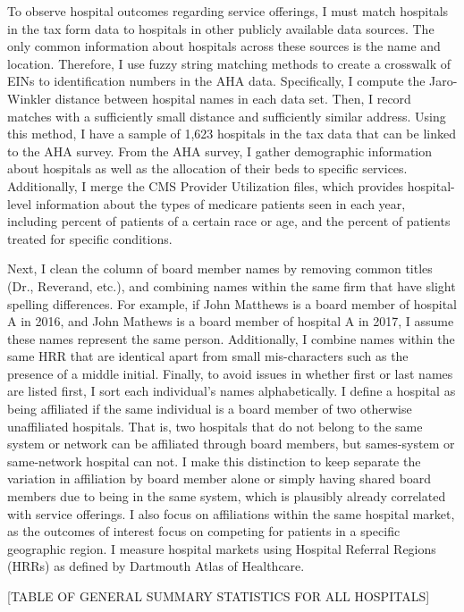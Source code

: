 \documentclass[12pt]{article}
\begin{document}
   To observe hospital outcomes regarding service offerings, I must match hospitals in the tax form data to hospitals in other publicly available data sources. The only common information about hospitals across these sources is the name and location. Therefore, I use fuzzy string matching methods to create a crosswalk of EINs to identification numbers in the AHA data. Specifically, I compute the Jaro-Winkler distance between hospital names in each data set. Then, I record matches with a sufficiently small distance and sufficiently similar address. Using this method, I have a sample of 1,623 hospitals in the tax data that can be linked to the AHA survey. From the AHA survey, I gather demographic information about hospitals as well as the allocation of their beds to specific services. Additionally, I merge the CMS Provider Utilization files, which provides hospital-level information about the types of medicare patients seen in each year, including percent of patients of a certain race or age, and the percent of patients treated for specific conditions.

    Next, I clean the column of board member names by removing common titles (Dr., Reverand, etc.), and combining names within the same firm that have slight spelling differences. For example, if John Matthews is a board member of hospital A in 2016, and John Mathews is a board member of hospital A in 2017, I assume these names represent the same person. Additionally, I combine names within the same HRR that are identical apart from small mis-characters such as the presence of a middle initial. Finally, to avoid issues in whether first or last names are listed first, I sort each individual's names alphabetically. I define a hospital as being affiliated if the same individual is a board member of two otherwise unaffiliated hospitals. That is, two hospitals that do not belong to the same system or network can be affiliated through board members, but sames-system or same-network hospital can not. I make this distinction to keep separate the variation in affiliation by board member alone or simply having shared board members due to being in the same system, which is plausibly already correlated with service offerings. I also focus on affiliations within the same hospital market, as the outcomes of interest focus on competing for patients in a specific geographic region. I measure hospital markets using Hospital Referral Regions (HRRs) as defined by Dartmouth Atlas of Healthcare.

    [TABLE OF GENERAL SUMMARY STATISTICS FOR ALL HOSPITALS]
    
\end{document}
